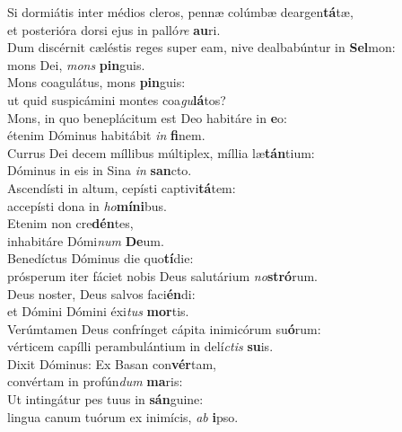 \evenverse Si dormiátis inter médios cleros, pennæ colúmbæ deargen\textbf{tá}tæ,~\*\\
\evenverse et posterióra dorsi ejus in palló\textit{re} \textbf{au}ri.\\
\oddverse Dum discérnit cæléstis reges super eam, nive dealbabúntur in \textbf{Sel}mon:~\*\\
\oddverse mons Dei, \textit{mons} \textbf{pin}guis.\\
\evenverse Mons coagulátus, mons \textbf{pin}guis:~\*\\
\evenverse ut quid suspicámini montes coa\textit{gu}\textbf{lá}tos?\\
\oddverse Mons, in quo beneplácitum est Deo habitáre in \textbf{e}o:~\*\\
\oddverse étenim Dóminus habitábit \textit{in} \textbf{fi}nem.\\
\evenverse Currus Dei decem míllibus múltiplex, míllia læ\textbf{tán}tium:~\*\\
\evenverse Dóminus in eis in Sina \textit{in} \textbf{san}cto.\\
\oddverse Ascendísti in altum, cepísti captivi\textbf{tá}tem:~\*\\
\oddverse accepísti dona in \textit{ho}\textbf{mí}\textbf{ni}bus.\\
\evenverse Etenim non cre\textbf{dén}tes,~\*\\
\evenverse inhabitáre Dómi\textit{num} \textbf{De}um.\\
\oddverse Benedíctus Dóminus die quo\textbf{tí}die:~\*\\
\oddverse prósperum iter fáciet nobis Deus salutárium \textit{no}\textbf{stró}rum.\\
\evenverse Deus noster, Deus salvos faci\textbf{én}di:~\*\\
\evenverse et Dómini Dómini éxi\textit{tus} \textbf{mor}tis.\\
\oddverse Verúmtamen Deus confrínget cápita inimicórum su\textbf{ó}rum:~\*\\
\oddverse vérticem capílli perambulántium in delí\textit{ctis} \textbf{su}is.\\
\evenverse Dixit Dóminus: Ex Basan con\textbf{vér}tam,~\*\\
\evenverse convértam in profún\textit{dum} \textbf{ma}ris:\\
\oddverse Ut intingátur pes tuus in \textbf{sán}guine:~\*\\
\oddverse lingua canum tuórum ex inimícis, \textit{ab} \textbf{i}pso.\\
